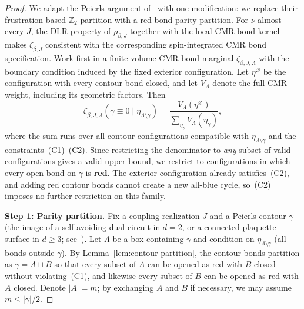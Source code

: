 \documentclass[11pt]{article}
\numberwithin{theorem}{section}
\theoremstyle{remark}
\begin{document}
\begin{proof}
We adapt the Peierls argument of~\cite[Theorem~2.2]{DSG1999} with one modification: we replace their frustration-based $\mathbb{Z}_2$ partition with a red-bond parity partition.
For $\nu$-almost every $J$, the DLR property of $\rho_{\beta,J}$ together with the local CMR bond kernel makes $\zeta_{\beta,J}$ consistent with the corresponding spin-integrated CMR bond specification.
Work first in a finite-volume CMR bond marginal $\zeta_{\beta,J,\Lambda}$ with the boundary condition induced by the fixed exterior configuration.
Let $\eta^\varnothing$ be the configuration with every contour bond closed, and let $V_\Lambda$ denote the full CMR weight, including its geometric factors.
Then
\[
  \zeta_{\beta,J,\Lambda}(\gamma \equiv 0 \mid \eta_{\Lambda \setminus \gamma})
  = \frac{V_\Lambda(\eta^\varnothing)}
         {\sum_{\eta_\gamma} V_\Lambda(\eta_\gamma)},
\]
where the sum runs over all contour configurations compatible with $\eta_{\Lambda \setminus \gamma}$ and the constraints~(C1)--(C2).
Since restricting the denominator to \emph{any} subset of valid configurations gives a valid upper bound, we restrict to configurations in which every open bond on $\gamma$ is \textbf{red}.
The exterior configuration already satisfies~(C2), and adding red contour bonds cannot create a new all-blue cycle, so~(C2) imposes no further restriction on this family.

\smallskip\noindent
\textbf{Step 1: Parity partition.}
Fix a coupling realization $J$ and a Peierls contour $\gamma$ (the image of a self-avoiding dual circuit in $d = 2$, or a connected plaquette surface in $d \geq 3$; see~\cite[p.~1786, 1791]{DSG1999}).
Let $\Lambda$ be a box containing $\gamma$ and condition on $\eta_{\Lambda \setminus \gamma}$ (all bonds outside $\gamma$).
By Lemma~\ref{lem:contour-partition}, the contour bonds partition as $\gamma = A \sqcup B$ so that every subset of $A$ can be opened as red with $B$ closed without violating~(C1), and likewise every subset of $B$ can be opened as red with $A$ closed.
Denote $|A| = m$; by exchanging $A$ and $B$ if necessary, we may assume $m \leq |\gamma|/2$.


\end{proof}
\end{document}
